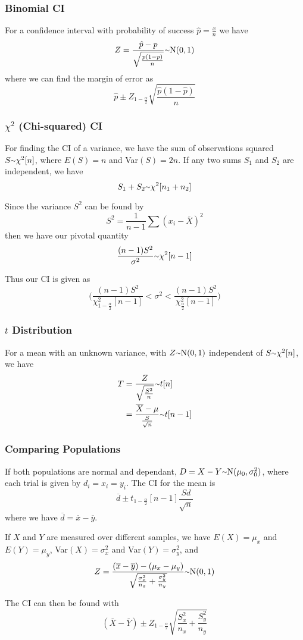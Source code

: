 \documentclass[12pt]{article}
\begin{document}
\subsubsection*{Binomial CI}
For a confidence interval with probability of success $\hat{p} = \frac{x}{n}$ we have \[ Z = \frac{\hat{p} - p}{\sqrt{\frac{p(1-p)}{n}}} \ttilde \text{N}(0,1) \] where we can find the margin of error as \[ \hat{p} \pm Z_{1-\frac{\alpha}{2}} \sqrt{\frac{\hat{p}(1-\hat{p})}{n}} \]

\subsubsection*{$\chi^2$ (Chi-squared) CI}
For finding the CI of a variance, we have the sum of observations squared $S \ttilde \chi^2[n]$, where $E(S) = n$ and Var$(S) = 2n$. If any two sums $S_1$ and $S_2$ are independent, we have \[ S_1 + S_2 \ttilde \chi^2[n_1+n_2] \]

Since the variance $S^2$ can be found by \[ S^2 = \frac{1}{n-1} \sum(x_i - \overline{X})^2 \] then we have our pivotal quantity \[ \frac{(n-1)S^2}{\sigma^2} \ttilde \chi^2[n-1] \]

Thus our CI is given as \[ \bigg( \frac{(n-1)S^2}{\chi^2_{1-\frac{\alpha}{2}} [n-1]} < \sigma^2 < \frac{(n-1)S^2}{\chi^2_{\frac{\alpha}{2}} [n-1]} \bigg) \]

\subsubsection*{$t$ Distribution}
For a mean with an unknown variance, with $Z \ttilde \text N (0,1)$ independent of $S \ttilde \chi^2[n]$, we have
\begin{align*}
T &= \frac{Z}{\sqrt\frac{S^2}{n}} \ttilde t[n]\\
  &= \frac{\overline{X} - \mu}{\frac{S}{\sqrt{n}}} \ttilde t[n-1]
\end{align*}

\subsubsection*{Comparing Populations}
If both populations are normal and dependant, $D = X - Y \ttilde \text N (\mu_0, \sigma^2_0)$, where each trial is given by $d_i = x_i = y_i$. The CI for the mean is \[ \overline{d} \pm t_{1-\frac{\alpha}{2}}[n-1] \frac{Sd}{\sqrt{n}} \] where we have $\overline{d} = \overline{x} - \overline{y}$.

If $X$ and $Y$ are measured over different samples, we have $E(X) = \mu_x$ and $E(Y) = \mu_y$, Var$(X) = \sigma^2_x$ and Var$(Y) = \sigma^2_y$, and \[ Z = \frac{(\overline{x} - \overline{y}) - (\mu_x -\mu_y)}{\sqrt{\frac{\sigma^2_x}{n_x} + \frac{\sigma^2_y}{n_y}}} \ttilde \text N (0,1) \]

The CI can then be found with \[ (\overline{X} - \overline{Y}) \pm Z_{1-\frac{\alpha}{2}} \sqrt{\frac{S^2_x}{n_x} + \frac{S^2_y}{n_y}} \]
\end{document}
